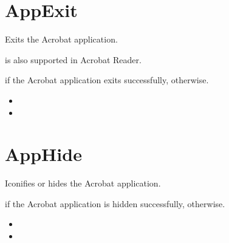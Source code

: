\documentclass[letterpaper,12pt,english,openany,oneside]{sphinxmanual}
\begin{document}
\section{AppExit}
\label{\detokenize{IAC_API_DDE_Messages:id14}}
Exits the Acrobat application.

 is also supported in Acrobat Reader.


\begin{sphinxVerbatim}[commandchars=\\\{\}]
\PYG{p}{[}\PYG{p}{]}
\end{sphinxVerbatim}


 if the Acrobat application exits successfully,  otherwise.

\begin{itemize}
\item {} 

\item {} 

\end{itemize}




\section{AppHide}
\label{\detokenize{IAC_API_DDE_Messages:id15}}
Iconifies or hides the Acrobat application.


\begin{sphinxVerbatim}[commandchars=\\\{\}]
\PYG{p}{[}\PYG{p}{]}
\end{sphinxVerbatim}


 if the Acrobat application is hidden successfully,  otherwise.

\label{\detokenize{IAC_API_DDE_Messages:related-methods-1}}
\begin{itemize}
\item {} 

\item {} 

\end{itemize}
\end{document}
